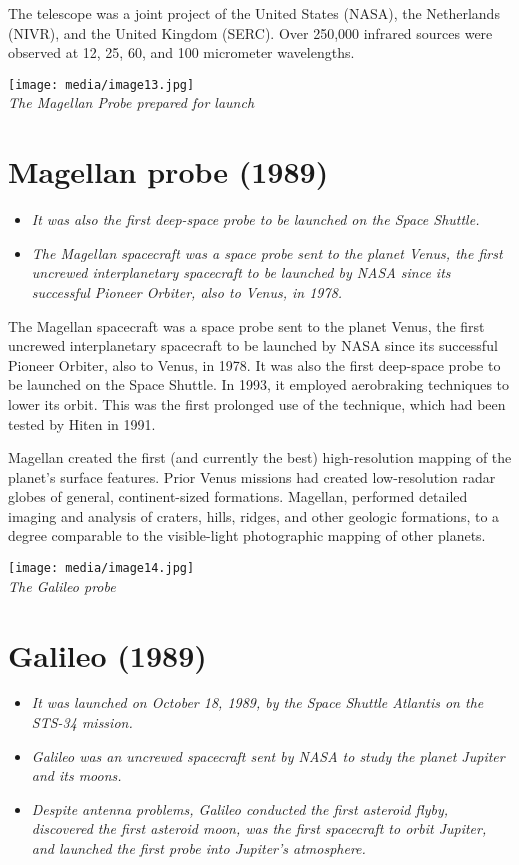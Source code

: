 The telescope was a joint project of the United States (NASA), the
Netherlands (NIVR), and the United Kingdom (SERC). Over 250,000 infrared
sources were observed at 12, 25, 60, and 100 micrometer wavelengths.

\texttt{[image: media/image13.jpg]}\\
\emph{The Magellan Probe prepared for launch}

\section{Magellan probe (1989)}\label{magellan-probe-1989}

\begin{itemize}
\item
  \emph{It was also the first deep-space probe to be launched on the
  Space Shuttle.}
\item
  \emph{The Magellan spacecraft was a space probe sent to the planet
  Venus, the first uncrewed interplanetary spacecraft to be launched by
  NASA since its successful Pioneer Orbiter, also to Venus, in 1978.}
\end{itemize}

The Magellan spacecraft was a space probe sent to the planet Venus, the
first uncrewed interplanetary spacecraft to be launched by NASA since
its successful Pioneer Orbiter, also to Venus, in 1978. It was also the
first deep-space probe to be launched on the Space Shuttle. In 1993, it
employed aerobraking techniques to lower its orbit. This was the first
prolonged use of the technique, which had been tested by Hiten in 1991.

Magellan created the first (and currently the best) high-resolution
mapping of the planet's surface features. Prior Venus missions had
created low-resolution radar globes of general, continent-sized
formations. Magellan, performed detailed imaging and analysis of
craters, hills, ridges, and other geologic formations, to a degree
comparable to the visible-light photographic mapping of other planets.

\texttt{[image: media/image14.jpg]}\\
\emph{The Galileo probe}

\section{Galileo (1989)}\label{galileo-1989}

\begin{itemize}
\item
  \emph{It was launched on October 18, 1989, by the Space Shuttle
  Atlantis on the STS-34 mission.}
\item
  \emph{Galileo was an uncrewed spacecraft sent by NASA to study the
  planet Jupiter and its moons.}
\item
  \emph{Despite antenna problems, Galileo conducted the first asteroid
  flyby, discovered the first asteroid moon, was the first spacecraft to
  orbit Jupiter, and launched the first probe into Jupiter's
  atmosphere.}
\end{itemize}

